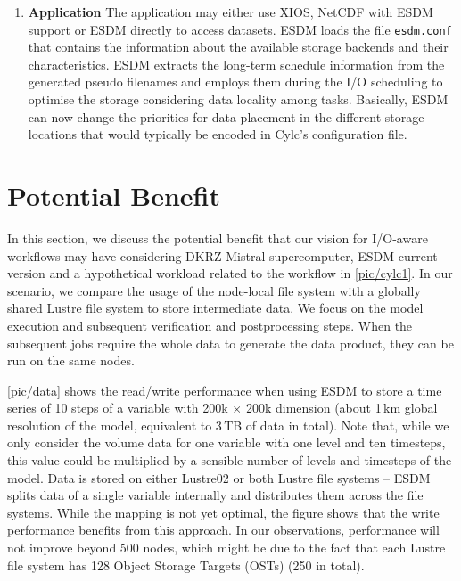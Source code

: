 \documentclass{superfri}
\begin{document}
\begin{enumerate}
  \item \textbf{Application}
  The application may either use XIOS, NetCDF with ESDM support or ESDM directly to access datasets.
  ESDM loads the file \texttt{esdm.conf} that contains the information about the available storage backends and their characteristics.
  ESDM extracts the long-term schedule information from the generated pseudo filenames and employs them during the I/O scheduling to optimise the storage considering data locality among tasks.
  Basically, ESDM can now change the priorities for data placement in the different storage locations that would typically be encoded in Cylc's configuration file.
\end{enumerate}

\section{Potential Benefit}
\label{sec:evaluation}

In this section, we discuss the potential benefit that our vision for I/O-aware workflows may have considering DKRZ Mistral supercomputer, ESDM current version and a hypothetical workload related to the workflow in \cref{pic/cylc1}.
In our scenario, we compare the usage of the node-local file system with a globally shared Lustre file system to store intermediate data.
We focus on the model execution and subsequent verification and postprocessing steps.
When the subsequent jobs require the whole data to generate the data product, they can be run on the same nodes.


\cref{pic/data} shows the read/write performance when using ESDM to store a time series of 10 steps of a variable with 200k $\times$ 200k dimension (about 1\,km global resolution of the model, equivalent to 3\,TB of data in total).
Note that, while we only consider the volume data for one variable with one level and ten timesteps, this value could be multiplied by a sensible number of levels and timesteps of the model.
Data is stored on either Lustre02 or both Lustre file systems -- ESDM splits data of a single variable internally and distributes them across the file systems.
While the mapping is not yet optimal, the figure shows that the write performance benefits from this approach.
In our observations, performance will not improve beyond 500 nodes, which might be due to the fact that each Lustre file system has 128 Object Storage Targets (OSTs) (250 in total).
\end{document}
